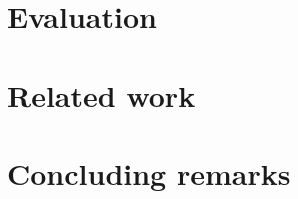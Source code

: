 \documentclass[times, 11pt,twocolumn]{article}
\begin{document}
\section{Evaluation}\label{sec:evaluation}


\section{Related work}\label{sec:related}

\section{Concluding remarks}\label{sec:concludings}




\end{document}
